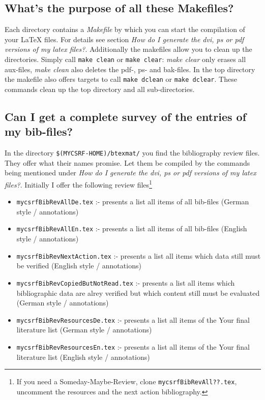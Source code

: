 \documentclass[
  DIV=calc,
  BCOR=5mm,
  11pt,
  headings=small,
  oneside,
  abstract=true,
  toc=bib,
  ngerman,english]{scrartcl}
\begin{document}
\subsection{What's the purpose of all these Makefiles?}
Each directory contains a \textit{Makefile} by which you can start the
compilation of your LaTeX files. For details see section \textit{How do I
generate the dvi, ps or pdf versions of my latex files?}. Additionally the
makefiles allow you to clean up the directories. Simply call \texttt{make clean}
or \texttt{make clear}: \textit{make clear} only erases all aux-files,
\textit{make clean} also deletes the pdf-, ps- and bak-files. In the top
directory the makefile also offers targets to call \texttt{make
dclean} or \texttt{make dclear}. These commands clean up the top directory and
all sub-directories.

\subsection{Can I get a complete survey of the entries of my bib-files?}
In the directory \texttt{\$(MYCSRF-HOME)/btexmat/} you find the bibliography
review files. They offer what their names promise. Let them be compiled by the
commands being mentioned under \textit{How do I generate the dvi, ps or pdf
versions of my latex files?}. Initially I offer the following review
files\footnote{If you need a Someday-Maybe-Review, clone
\texttt{mycsrfBibRevAll??.tex}, uncomment the resources and the next action
bibliography.}

\begin{itemize}
  \item \texttt{mycsrfBibRevAllDe.tex} :- presents a list all items of all
  bib-files (German style / annotations)
  \item \texttt{mycsrfBibRevAllEn.tex} :- presents a list all items of all
  bib-files (English style / annotations)
  \item \texttt{mycsrfBibRevNextAction.tex} :- presents a list all items 
  which data still must be verified (English style / annotations)
  \item \texttt{mycsrfBibRevCopiedButNotRead.tex} :- presents a list all items 
  which bibliographic data are alrey verified but which content still
  must be evaluated (German style / annotations)
  \item \texttt{mycsrfBibRevResourcesDe.tex} :- presents a list all items of
  the Your final literature list (German style / annotations)
  \item \texttt{mycsrfBibRevResourcesEn.tex} :- presents a list all items of
  the Your final literature list (English style / annotations)
\end{itemize}
\end{document}
